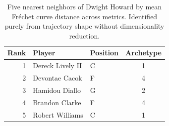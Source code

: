 \begin{table}[htbp]
  \centering\small
  \begin{tabular}{rllc}
    \toprule
    Rank & Player & Position & Archetype \\
    \midrule
    1 & Dereck Lively II & C & 1 \\
    2 & Devontae Cacok & F & 4 \\
    3 & Hamidou Diallo & G & 2 \\
    4 & Brandon Clarke & F & 4 \\
    5 & Robert Williams & C & 1 \\
    \bottomrule
  \end{tabular}
  \caption{Five nearest neighbors of Dwight Howard by mean Fr\'{e}chet curve distance across metrics. Identified purely from trajectory shape without dimensionality reduction.}
  \label{tab:Dwight_Howard_frechet_curve_neighbors}
\end{table}

